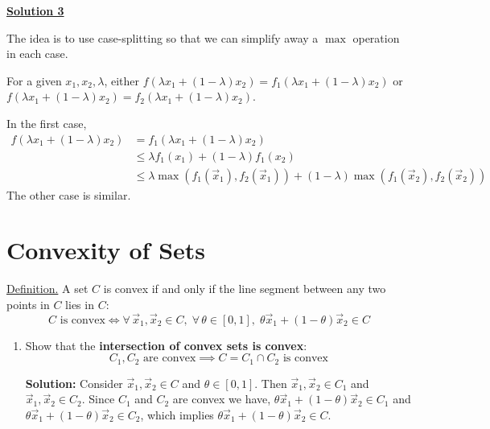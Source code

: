 \documentclass[10pt]{article}
\begin{document}
\begin{enumerate}[label=(\alph*)]
    \underline{\textbf{Solution 3}}

    The idea is to use case-splitting so that we can simplify away a $\max$ operation in each case.

    For a given $x_1, x_2, \lambda$, either $f(\lambda x_1 + (1-\lambda)x_2) = f_1(\lambda x_1 + (1-\lambda)x_2)$ or $f(\lambda x_1 + (1-\lambda)x_2) = f_2(\lambda x_1 + (1-\lambda)x_2)$.

    In the first case,
    \begin{align}
        f(\lambda x_1 + (1-\lambda)x_2) &= f_1(\lambda x_1 + (1-\lambda)x_2) \\
        &\leq \lambda f_1(x_1) + (1-\lambda) f_1(x_2) \\
        &\leq \lambda \max(f_1(\vec{x}_1), f_2(\vec{x}_1)) + (1-\lambda)\max(f_1(\vec{x}_2), f_2(\vec{x}_2))
    \end{align}
    The other case is similar.
\end{enumerate}

\section{Convexity of Sets}

\underline{Definition.} A set $C$ is convex if and only if the line segment between any two points in $C$ lies in $C$:
\begin{equation}
    C \text{ is convex} \iff \forall\, \vec{x}_1, \vec{x}_2 \in C,\; \forall\, \theta \in [0,1],\; \theta \vec{x}_1 + (1-\theta)\vec{x}_2 \in C
\end{equation}

\begin{enumerate}[label=(\alph*)]
    \item Show that the \textbf{intersection of convex sets is convex}:
    \begin{equation}
        C_1, C_2 \text{ are convex} \implies C = C_1 \cap C_2 \text{ is convex}
    \end{equation}

    \textbf{Solution:} Consider $\vec{x}_1, \vec{x}_2 \in C$ and $\theta \in [0,1]$. Then $\vec{x}_1, \vec{x}_2 \in C_1$ and $\vec{x}_1, \vec{x}_2 \in C_2$. Since $C_1$ and $C_2$ are convex we have, $\theta \vec{x}_1 + (1-\theta)\vec{x}_2 \in C_1$ and $\theta \vec{x}_1 + (1-\theta)\vec{x}_2 \in C_2$, which implies $\theta \vec{x}_1 + (1-\theta)\vec{x}_2 \in C$.
\end{enumerate}
\end{document}
